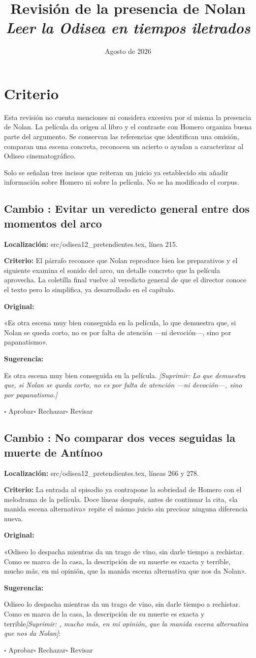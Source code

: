 \documentclass[12pt,a4paper]{article}
\title{Revisión de la presencia de Nolan\\[0.4em]\large\emph{Leer la Odisea en tiempos iletrados}}
\author{}
\date{Agosto de 2026}
\newcommand{\quita}[1]{\textcolor{rojocambio}{\textit{[Suprimir: #1]}}}
\newcounter{cambio}
\newcommand{\propuesta}[5]{%
  \refstepcounter{cambio}%
  \subsection*{Cambio \thecambio: #1}
  \noindent\textbf{Localización:} #2.\par
  \noindent\textbf{Criterio:} #3\par
  \medskip
  \noindent\textbf{Original:}\par
  #4\par
  \medskip
  \noindent\textbf{Sugerencia:}\par
  #5\par
  \medskip
  \noindent$\square$ Aprobar\qquad$\square$ Rechazar\qquad$\square$ Revisar
  \par\bigskip
}
\begin{document}
\maketitle

\section*{Criterio}

Esta revisión no cuenta menciones ni considera excesiva por sí misma la presencia de Nolan. La película da origen al libro y el contraste con Homero organiza buena parte del argumento. Se conservan las referencias que identifican una omisión, comparan una escena concreta, reconocen un acierto o ayudan a caracterizar al Odiseo cinematográfico.

Solo se señalan tres incisos que reiteran un juicio ya establecido sin añadir información sobre Homero ni sobre la película. No se ha modificado el corpus.

\propuesta
  {Evitar un veredicto general entre dos momentos del arco}
  {src/odisea12\_pretendientes.tex, línea 215}
  {El párrafo reconoce que Nolan reproduce bien los preparativos y el siguiente examina el sonido del arco, un detalle concreto que la película aprovecha. La coletilla final vuelve al veredicto general de que el director conoce el texto pero lo simplifica, ya desarrollado en el capítulo.}
  {«Es otra escena muy bien conseguida en la película, lo que demuestra que, si Nolan se queda corto, no es por falta de atención ---ni devoción---, sino por papanatismo».}
  {Es otra escena muy bien conseguida en la película. \quita{Lo que demuestra que, si Nolan se queda corto, no es por falta de atención ---ni devoción---, sino por papanatismo.}}

\propuesta
  {No comparar dos veces seguidas la muerte de Antínoo}
  {src/odisea12\_pretendientes.tex, líneas 266 y 278}
  {La entrada al episodio ya contrapone la sobriedad de Homero con el melodrama de la película. Doce líneas después, antes de continuar la cita, «la manida escena alternativa» repite el mismo juicio sin precisar ninguna diferencia nueva.}
  {«Odiseo lo despacha mientras da un trago de vino, sin darle tiempo a rechistar. Como es marca de la casa, la descripción de su muerte es exacta y terrible, mucho más, en mi opinión, que la manida escena alternativa que nos da Nolan».}
  {Odiseo lo despacha mientras da un trago de vino, sin darle tiempo a rechistar. Como es marca de la casa, la descripción de su muerte es exacta y terrible\quita{, mucho más, en mi opinión, que la manida escena alternativa que nos da Nolan}:}
\end{document}
